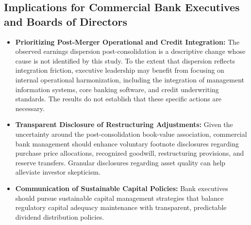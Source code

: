 \subsection{Implications for Commercial Bank Executives and Boards of Directors}
\begin{itemize}
    \item \textbf{Prioritizing Post-Merger Operational and Credit Integration:}
    The observed earnings dispersion post-consolidation is a descriptive change whose cause is not identified by this study. To the extent that dispersion reflects integration friction, executive leadership may benefit from focusing on internal operational harmonization, including the integration of management information systems, core banking software, and credit underwriting standards. The results do not establish that these specific actions are necessary.
    \item \textbf{Transparent Disclosure of Restructuring Adjustments:}
    Given the uncertainty around the post-consolidation book-value association, commercial bank management should enhance voluntary footnote disclosures regarding purchase price allocations, recognized goodwill, restructuring provisions, and reserve transfers. Granular disclosures regarding asset quality can help alleviate investor skepticism.
    \item \textbf{Communication of Sustainable Capital Policies:}
    Bank executives should pursue sustainable capital management strategies that balance regulatory capital adequacy maintenance with transparent, predictable dividend distribution policies.
\end{itemize}

